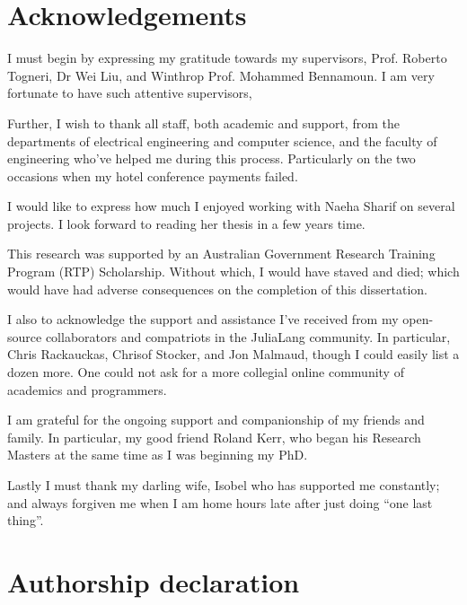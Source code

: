 \documentclass{book}
\begin{document}
\chapter*{Acknowledgements}

I must begin by expressing my gratitude towards my supervisors,
Prof. Roberto Togneri, Dr Wei Liu, and Winthrop Prof. Mohammed Bennamoun.
I am very fortunate to have such attentive supervisors,


Further, I wish to thank all staff, both academic and support, from the departments of electrical engineering and computer science, and the faculty of engineering who've helped me during this process.
Particularly on the two occasions when my hotel conference payments failed.


I would like to express how much I enjoyed working with Naeha Sharif on several projects.
I look forward to reading her thesis in a few years time.



This research was supported by an Australian Government Research Training Program (RTP) Scholarship.
Without which, I would have staved and died; which would have had adverse consequences on the completion of this dissertation.

I also to acknowledge the support and assistance I've received from my open-source collaborators and compatriots in the JuliaLang community.
In particular, Chris Rackauckas, Chrisof Stocker, and Jon Malmaud, though I could easily list a dozen more.
One could not ask for a more collegial online community of academics and programmers.

I am grateful for the ongoing support and companionship of my friends and family.
In particular, my good friend Roland Kerr, who began his Research Masters at the same time as I was beginning my PhD.


Lastly I must thank my darling wife, Isobel who has supported me constantly;
and always forgiven me when I am home hours late after just doing ``one last thing''.


\chapter*{Authorship declaration}

\end{document}
